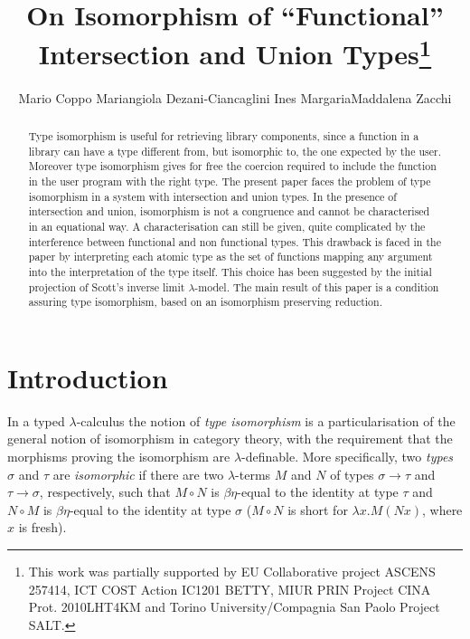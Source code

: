 \documentclass[UKenglish]{eptcs}
\title{On Isomorphism of  ``Functional''\\ Intersection and Union Types\footnote{
 This work was partially supported by EU Collaborative project  ASCENS 257414, ICT COST Action IC1201 BETTY, MIUR PRIN Project CINA Prot. 2010LHT4KM and Torino University/Compagnia San Paolo Project SALT. }}
\author{Mario Coppo\quad
Mariangiola Dezani-Ciancaglini\quad
Ines Margaria\quad Maddalena Zacchi
\institute{Dipartimento di Informatica Universit\`a di Torino,
corso Svizzera 185, 10149 Torino, Italy}
}
\newcommand{\tS}{\sigma}       \newcommand{\tT}{\tau}
\begin{document}
\maketitle






\begin{abstract}
 Type isomorphism is useful for retrieving library components, since a function in a library can have a type different from, but isomorphic to,  the one expected by the user. Moreover type isomorphism gives for free the coercion required to include the function in the user program with the right type. The present paper faces the problem of type isomorphism in a system with intersection  and union types. In the presence of intersection and union, isomorphism is not a congruence and cannot be characterised in an equational way. A characterisation can still be given, quite complicated by the interference between functional and non functional types. This drawback is faced in the paper by interpreting each  atomic type as the set of functions mapping any argument into the interpretation of the type itself. This choice has been suggested by the initial projection of Scott's inverse limit $\lambda$-model.
The main result of this paper is a condition assuring type isomorphism, based on
an isomorphism preserving reduction.



\end{abstract}

\section{Introduction}


In a typed $\lambda$-calculus the notion of \emph{type isomorphism}  is a particularisation of the general notion of isomorphism in category theory, with the requirement that the morphisms proving the isomorphism are $\lambda$-definable.
More specifically, two \emph{types} $\tS$ and $\tT$ are \emph{isomorphic} if there are two $\lambda$-terms
$M$ and $N$ of types $\tS\to\tT$ and $\tT\to\tS$, respectively, such that $M\circ N$ is  $\beta\eta$-equal to the identity at type $\tT$ and  $N\circ M$ is  $\beta\eta$-equal to the identity at type $\tS$ ($M\circ N$ is short for $\lambda x. M(Nx)$, where $x$ is fresh).
\end{document}
